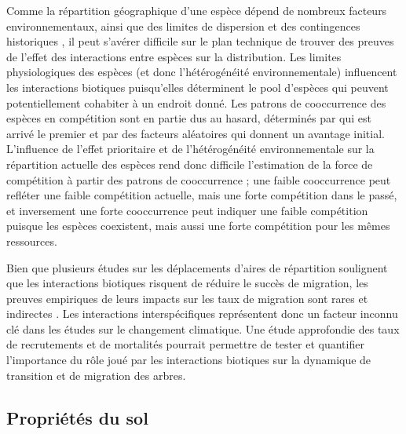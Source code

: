 Comme la répartition géographique d'une espèce dépend de nombreux
facteurs environnementaux, ainsi que des limites de dispersion et des
contingences historiques
\citep{pulliam_relationship_2000, holt_bringing_2009, godsoe_i_2010}, il
peut s'avérer difficile sur le plan technique de trouver des preuves de
l'effet des interactions entre espèces sur la distribution. Les limites
physiologiques des espèces (et donc l'hétérogénéité environnementale)
influencent les interactions biotiques puisqu'elles déterminent le pool
d'espèces qui peuvent potentiellement cohabiter à un endroit donné. Les
patrons de cooccurrence des espèces en compétition sont en partie dus au
hasard, déterminés par qui est arrivé le premier et par des facteurs
aléatoires qui donnent un avantage initial. L'influence de l'effet
prioritaire et de l'hétérogénéité environnementale sur la répartition
actuelle des espèces rend donc difficile l'estimation de la force de
compétition à partir des patrons de cooccurrence ; une faible
cooccurrence peut refléter une faible compétition actuelle, mais une
forte compétition dans le passé, et inversement une forte cooccurrence
peut indiquer une faible compétition puisque les espèces coexistent,
mais aussi une forte compétition pour les mêmes ressources.

Bien que plusieurs études sur les déplacements d'aires de répartition
soulignent que les interactions biotiques risquent de réduire le succès
de migration, les preuves empiriques de leurs impacts sur les taux de
migration sont rares et indirectes \citep{svenning_influence_2014}. Les
interactions interspécifiques représentent donc un facteur inconnu clé
dans les études sur le changement climatique. Une étude approfondie des
taux de recrutements et de mortalités pourrait permettre de tester et
quantifier l'importance du rôle joué par les interactions biotiques sur
la dynamique de transition et de migration des arbres.

\hypertarget{propriuxe9tuxe9s-du-sol}{%
\subsection{Propriétés du sol}\label{propriuxe9tuxe9s-du-sol}}

